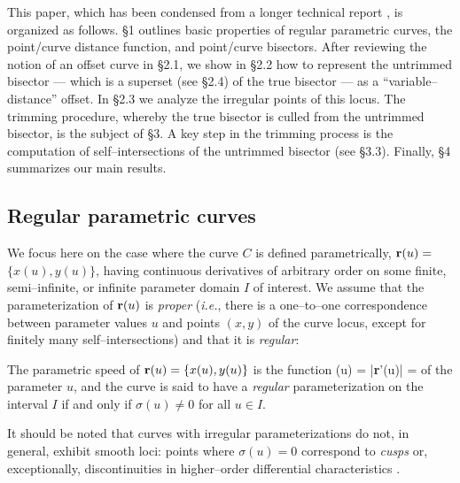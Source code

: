This paper, which has been condensed from a longer technical
report \cite{farouki91}, is organized as follows. \S1 outlines
basic properties of regular parametric curves, the point/curve
distance function, and point/curve bisectors. After reviewing
the notion of an offset curve in \S2.1, we show in \S2.2 how to
represent the untrimmed bisector --- which is a superset (see \S2.4)
of the true bisector --- as a ``variable--distance'' offset. In
\S2.3 we analyze the irregular points of this locus. The trimming
procedure, whereby the true bisector is culled from the untrimmed
bisector, is the subject of \S3. A key step in the trimming process
is the computation of self--intersections of the untrimmed bisector
(see \S3.3). Finally, \S4 summarizes our main results.

\subsection{Regular parametric curves}

We focus here on the case where the curve $C$ is defined
parametrically, ${\bf r}(u)=$ $\{x(u),y(u)\}$, having continuous
derivatives
of arbitrary order on some finite, semi--infinite, or infinite
parameter domain $I$ of interest. We assume that the parameterization
of ${\bf r}(u)$ is {\it proper\/} ({\it i.e.}, there is a one--to--one
correspondence between parameter values $u$ and points $(x,y)$ of the
curve locus, except for finitely many self--intersections) and that
it is {\it regular\/}:


\begin{dfn}
The parametric speed of ${\bf r}(u)=\{x(u),y(u)\}$ is the
function
\be \label{sigma}
\sigma(u) = |{\bf r}'(u)| = 
\ee
of the parameter $u$, and the curve is said to have a {\it
regular\/} parameterization on the interval $I$ if and only if
$\sigma(u)\not=0$ for all $u \in I$.
\end{dfn}

It should be noted that curves with
irregular parameterizations do not, in general, exhibit smooth
loci: points where $\sigma(u)=0$ correspond to {\it cusps\/}
or, exceptionally, discontinuities
in higher--order differential characteristics \cite{farouki92b}.

